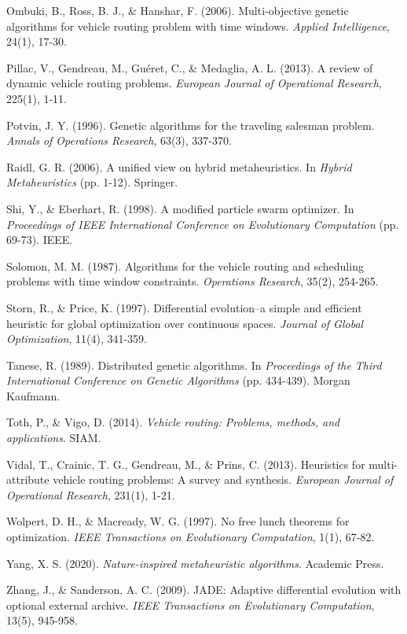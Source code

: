 \documentclass[12pt,a4paper]{article}
\begin{document}
\begin{thebibliography}{99}
Ombuki, B., Ross, B. J., \& Hanshar, F. (2006). Multi-objective genetic algorithms for vehicle routing problem with time windows. \textit{Applied Intelligence}, 24(1), 17-30.

Pillac, V., Gendreau, M., Guéret, C., \& Medaglia, A. L. (2013). A review of dynamic vehicle routing problems. \textit{European Journal of Operational Research}, 225(1), 1-11.

Potvin, J. Y. (1996). Genetic algorithms for the traveling salesman problem. \textit{Annals of Operations Research}, 63(3), 337-370.

Raidl, G. R. (2006). A unified view on hybrid metaheuristics. In \textit{Hybrid Metaheuristics} (pp. 1-12). Springer.

Shi, Y., \& Eberhart, R. (1998). A modified particle swarm optimizer. In \textit{Proceedings of IEEE International Conference on Evolutionary Computation} (pp. 69-73). IEEE.

Solomon, M. M. (1987). Algorithms for the vehicle routing and scheduling problems with time window constraints. \textit{Operations Research}, 35(2), 254-265.

Storn, R., \& Price, K. (1997). Differential evolution–a simple and efficient heuristic for global optimization over continuous spaces. \textit{Journal of Global Optimization}, 11(4), 341-359.

Tanese, R. (1989). Distributed genetic algorithms. In \textit{Proceedings of the Third International Conference on Genetic Algorithms} (pp. 434-439). Morgan Kaufmann.

Toth, P., \& Vigo, D. (2014). \textit{Vehicle routing: Problems, methods, and applications}. SIAM.

Vidal, T., Crainic, T. G., Gendreau, M., \& Prins, C. (2013). Heuristics for multi-attribute vehicle routing problems: A survey and synthesis. \textit{European Journal of Operational Research}, 231(1), 1-21.

Wolpert, D. H., \& Macready, W. G. (1997). No free lunch theorems for optimization. \textit{IEEE Transactions on Evolutionary Computation}, 1(1), 67-82.

Yang, X. S. (2020). \textit{Nature-inspired metaheuristic algorithms}. Academic Press.

Zhang, J., \& Sanderson, A. C. (2009). JADE: Adaptive differential evolution with optional external archive. \textit{IEEE Transactions on Evolutionary Computation}, 13(5), 945-958.

\end{thebibliography}
\end{document}
